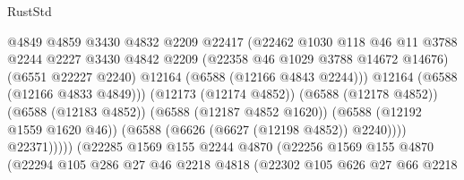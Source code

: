 \begin{lexlean}{RustStd}
\begin{coremodule}
                                            @4849
                                            @4859
                                            @3430
                                            @4832
                                            @2209
                                            @22417
                                            (@22462
                                              @1030
                                              @118
                                              @46
                                              @11
                                              @3788
                                              @2244
                                              @2227
                                              @3430
                                              @4842
                                              @2209
                                              (@22358 @46 @1029 @3788 @14672 @14676)
                                              (@6551 @22227 @2240)
                                              @12164
                                              (@6588 (@12166 @4843 @2244)))
                                            @12164
                                            (@6588 (@12166 @4833 @4849)))
                                          (@12173 (@12174 @4852))
                                          (@6588 (@12178 @4852))
                                          (@6588 (@12183 @4852))
                                          (@6588 (@12187 @4852 @1620))
                                          (@6588 (@12192 @1559 @1620 @46))
                                          (@6588 (@6626 (@6627 (@12198 @4852)) @2240))))
                                      @22371)))))
                            (@22285
                              @1569
                              @155
                              @2244
                              @4870
                              (@22256
                                @1569
                                @155
                                @4870
                                (@22294
                                  @105
                                  @286
                                  @27
                                  @46
                                  @2218
                                  @4818
                                  (@22302
                                    @105
                                    @626
                                    @27
                                    @66
                                    @2218

\end{coremodule}
\end{lexlean}
